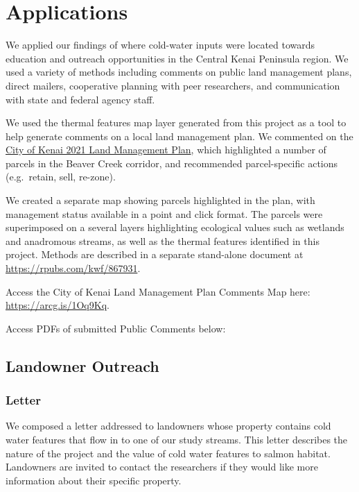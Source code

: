 \documentclass[
  letterpaper,
  DIV=11,
  numbers=noendperiod]{scrreprt}
\begin{document}

\hypertarget{applications}{%
\chapter{Applications}\label{applications}}

We applied our findings of where cold-water inputs were located towards
education and outreach opportunities in the Central Kenai Peninsula
region. We used a variety of methods including comments on public land
management plans, direct mailers, cooperative planning with peer
researchers, and communication with state and federal agency staff.

We used the thermal features map layer generated from this project as a
tool to help generate comments on a local land management plan. We
commented on the
\href{https://www.kenai.city/lands/page/land-management-plan}{City of
Kenai 2021 Land Management Plan}, which highlighted a number of parcels
in the Beaver Creek corridor, and recommended parcel-specific actions
(e.g.~retain, sell, re-zone).

We created a separate map showing parcels highlighted in the plan, with
management status available in a point and click format. The parcels
were superimposed on a several layers highlighting ecological values
such as wetlands and anadromous streams, as well as the thermal features
identified in this project. Methods are described in a separate
stand-alone document at \url{https://rpubs.com/kwf/867931}.

Access the City of Kenai Land Management Plan Comments Map here:
\url{https://arcg.is/1Oq9Kq}.

Access PDFs of submitted Public Comments below:

\hypertarget{landowner-outreach}{%
\section{Landowner Outreach}\label{landowner-outreach}}

\hypertarget{letter}{%
\subsection{Letter}\label{letter}}

We composed a letter addressed to landowners whose property contains
cold water features that flow in to one of our study streams. This
letter describes the nature of the project and the value of cold water
features to salmon habitat. Landowners are invited to contact the
researchers if they would like more information about their specific
property.
\end{document}

